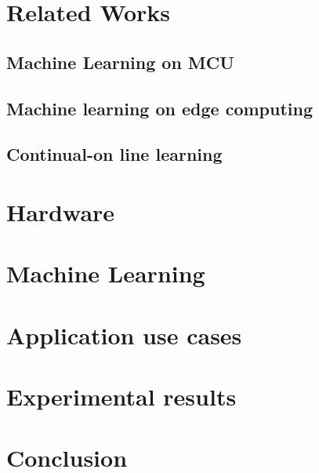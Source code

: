 \documentclass[12pt]{report}
\begin{document}
\chapter{Related Works}


\section{Machine Learning on MCU}


\section{Machine learning on edge computing}


\section{Continual-on line learning}








\chapter{Hardware} 








\chapter{Machine Learning}





\chapter{Application use cases}







\chapter{Experimental results} 






\chapter{Conclusion}













\end{document}
